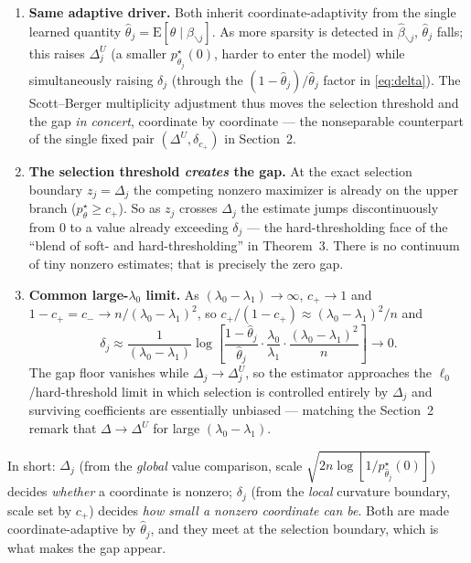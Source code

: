 \documentclass[11pt]{article}
\newcommand{\bhat}{\widehat{\beta}}
\newcommand{\pstar}{p^{\star}}
\newcommand{\thetahat}{\widehat{\theta}}
\newcommand{\Estar}{\mathrm{E}}
\newcommand{\lamdiff}{(\lambda_0-\lambda_1)}
\newcommand{\betasub}{\bhat_{\backslash j}}
\begin{document}
\begin{enumerate}
\item \textbf{Same adaptive driver.} Both inherit coordinate-adaptivity from the
single learned quantity $\thetahat_j = \Estar[\theta\mid\betasub]$. As more
sparsity is detected in $\betasub$, $\thetahat_j$ falls; this raises
$\Delta_j^U$ (a smaller $\pstar_{\thetahat_j}(0)$, harder to enter the model)
while simultaneously raising $\delta_j$ (through the
$(1-\thetahat_j)/\thetahat_j$ factor in \eqref{eq:delta}). The
Scott--Berger multiplicity adjustment thus moves the selection threshold and the
gap \emph{in concert}, coordinate by coordinate --- the nonseparable counterpart
of the single fixed pair $(\Delta^U,\delta_{c_+})$ in Section~2.

\item \textbf{The selection threshold \emph{creates} the gap.} At the exact
selection boundary $z_j = \Delta_j$ the competing nonzero maximizer is already on
the upper branch ($\pstar_\theta \ge c_+$). So as $z_j$ crosses $\Delta_j$ the
estimate jumps discontinuously from $0$ to a value already exceeding $\delta_j$
--- the hard-thresholding face of the ``blend of soft- and hard-thresholding''
in Theorem~3. There is no continuum of tiny nonzero estimates; that is precisely
the zero gap.

\item \textbf{Common large-$\lambda_0$ limit.} As $\lamdiff\to\infty$,
$c_+\to 1$ and $1-c_+ = c_- \to n/\lamdiff^2$, so
$c_+/(1-c_+) \approx \lamdiff^2/n$ and
\begin{equation*}
  \delta_j \approx \frac{1}{\lamdiff}
    \log\!\left[
      \frac{1-\thetahat_j}{\thetahat_j}\cdot
      \frac{\lambda_0}{\lambda_1}\cdot
      \frac{\lamdiff^2}{n}
    \right] \longrightarrow 0.
\end{equation*}
The gap floor vanishes while $\Delta_j\to\Delta_j^U$, so the estimator
approaches the $\ell_0$/hard-threshold limit in which selection is controlled
entirely by $\Delta_j$ and surviving coefficients are essentially unbiased ---
matching the Section~2 remark that $\Delta\to\Delta^U$ for large $\lamdiff$.
\end{enumerate}

\medskip
\noindent
In short: $\Delta_j$ (from the \emph{global} value comparison, scale
$\sqrt{2n\log[1/\pstar_{\thetahat_j}(0)]}$) decides \emph{whether} a coordinate
is nonzero; $\delta_j$ (from the \emph{local} curvature boundary, scale set by
$c_+$) decides \emph{how small a nonzero coordinate can be}. Both are made
coordinate-adaptive by $\thetahat_j$, and they meet at the selection boundary,
which is what makes the gap appear.
\end{document}

